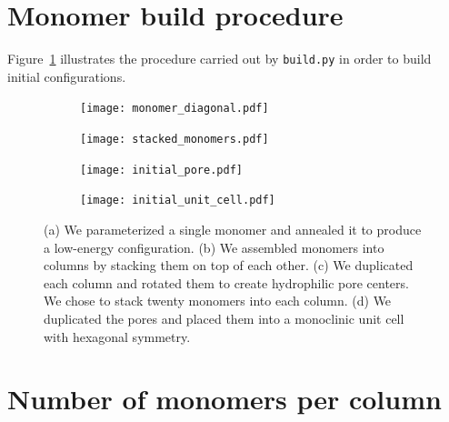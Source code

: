 \documentclass{article}
\begin{document}
  \clearpage  
  
  \section{Monomer build procedure}\label{section:monomer_build_procedure}
  
  Figure~\ref{fig:build_procedure} illustrates the procedure carried out by 
  \texttt{build.py} in order to build initial configurations.  
  
  \begin{figure}[!htb]
  \centering
  \begin{subfigure}[t]{0.45\textwidth}
  \texttt{[image: monomer\_diagonal.pdf]}
  \caption{}
  \end{subfigure}
  \begin{subfigure}[t]{0.42\textwidth}
  \texttt{[image: stacked\_monomers.pdf]}
  \caption{}
  \end{subfigure}
  \begin{subfigure}[t]{0.35\textwidth}
  \texttt{[image: initial\_pore.pdf]}
  \caption{}
  \end{subfigure}
  \begin{subfigure}[t]{0.45\textwidth}
  \texttt{[image: initial\_unit\_cell.pdf]}
  \caption{}
  \end{subfigure}
  \caption{(a) We parameterized a single monomer and annealed it to produce a low-energy
		configuration. (b) We assembled monomers into columns by stacking them on top of each 
		other. (c) We duplicated each column and rotated them to create hydrophilic pore centers.
		We chose to stack twenty monomers into each column. (d) We duplicated the pores and 
		placed them into a monoclinic unit cell with hexagonal symmetry.}\label{fig:build_procedure}
  \end{figure}

  \section{Number of monomers per column}\label{section:monomers_per_column}
  
\end{document}
